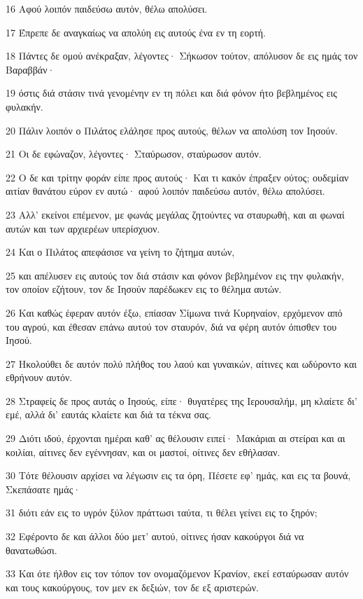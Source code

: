 \par 16 Αφού λοιπόν παιδεύσω αυτόν, θέλω απολύσει.
\par 17 Έπρεπε δε αναγκαίως να απολύη εις αυτούς ένα εν τη εορτή.
\par 18 Πάντες δε ομού ανέκραξαν, λέγοντες· Σήκωσον τούτον, απόλυσον δε εις ημάς τον Βαραββάν·
\par 19 όστις διά στάσιν τινά γενομένην εν τη πόλει και διά φόνον ήτο βεβλημένος εις φυλακήν.
\par 20 Πάλιν λοιπόν ο Πιλάτος ελάλησε προς αυτούς, θέλων να απολύση τον Ιησούν.
\par 21 Οι δε εφώναζον, λέγοντες· Σταύρωσον, σταύρωσον αυτόν.
\par 22 Ο δε και τρίτην φοράν είπε προς αυτούς· Και τι κακόν έπραξεν ούτος; ουδεμίαν αιτίαν θανάτου εύρον εν αυτώ· αφού λοιπόν παιδεύσω αυτόν, θέλω απολύσει.
\par 23 Αλλ' εκείνοι επέμενον, με φωνάς μεγάλας ζητούντες να σταυρωθή, και αι φωναί αυτών και των αρχιερέων υπερίσχυον.
\par 24 Και ο Πιλάτος απεφάσισε να γείνη το ζήτημα αυτών,
\par 25 και απέλυσεν εις αυτούς τον διά στάσιν και φόνον βεβλημένον εις την φυλακήν, τον οποίον εζήτουν, τον δε Ιησούν παρέδωκεν εις το θέλημα αυτών.
\par 26 Και καθώς έφεραν αυτόν έξω, επίασαν Σίμωνα τινά Κυρηναίον, ερχόμενον από του αγρού, και έθεσαν επάνω αυτού τον σταυρόν, διά να φέρη αυτόν όπισθεν του Ιησού.
\par 27 Ηκολούθει δε αυτόν πολύ πλήθος του λαού και γυναικών, αίτινες και ωδύροντο και εθρήνουν αυτόν.
\par 28 Στραφείς δε προς αυτάς ο Ιησούς, είπε· θυγατέρες της Ιερουσαλήμ, μη κλαίετε δι' εμέ, αλλά δι' εαυτάς κλαίετε και διά τα τέκνα σας.
\par 29 Διότι ιδού, έρχονται ημέραι καθ' ας θέλουσιν ειπεί· Μακάριαι αι στείραι και αι κοιλίαι, αίτινες δεν εγέννησαν, και οι μαστοί, οίτινες δεν εθήλασαν.
\par 30 Τότε θέλουσιν αρχίσει να λέγωσιν εις τα όρη, Πέσετε εφ' ημάς, και εις τα βουνά, Σκεπάσατε ημάς·
\par 31 διότι εάν εις το υγρόν ξύλον πράττωσι ταύτα, τι θέλει γείνει εις το ξηρόν;
\par 32 Εφέροντο δε και άλλοι δύο μετ' αυτού, οίτινες ήσαν κακούργοι διά να θανατωθώσι.
\par 33 Και ότε ήλθον εις τον τόπον τον ονομαζόμενον Κρανίον, εκεί εσταύρωσαν αυτόν και τους κακούργους, τον μεν εκ δεξιών, τον δε εξ αριστερών.
